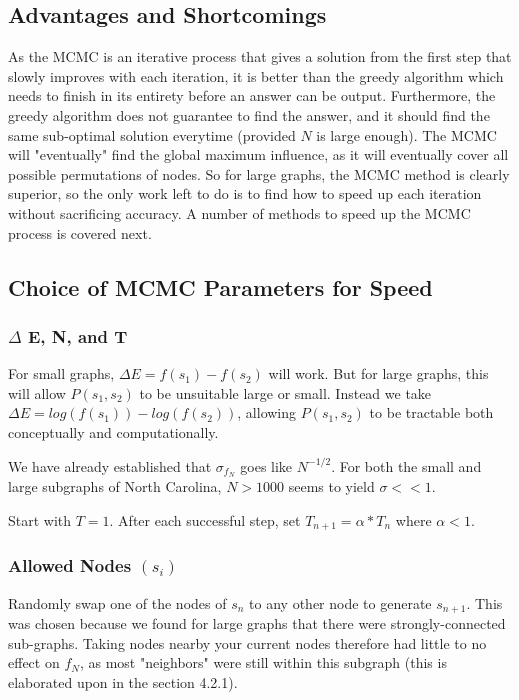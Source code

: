 \documentclass{article}
\begin{document}
	\subsection{Advantages and Shortcomings}
	
	As the MCMC is an iterative process that gives a solution from the first step that slowly improves with each iteration, it is better than the greedy algorithm which needs to finish in its entirety before an answer can be output. Furthermore, the greedy algorithm does not guarantee to find the answer, and it should find the same sub-optimal solution everytime (provided $N$ is large enough). The MCMC will "eventually" find the global maximum influence, as it will eventually cover all possible permutations of nodes. So for large graphs, the MCMC method is clearly superior, so the only work left to do is to find how to speed up each iteration without sacrificing accuracy. A number of methods to speed up the MCMC process is covered next.
	
	\subsection{Choice of MCMC Parameters for Speed}
	
	\subsubsection{$\Delta$ E, N, and T}
	
	For small graphs, $\Delta E = f(s_1) - f(s_2)$ will work. But for large graphs, this will allow $P(s_1,s_2)$ to be unsuitable large or small. Instead we take $\Delta E = log(f(s_1)) - log(f(s_2))$, allowing $P(s_1,s_2)$ to be tractable both conceptually and computationally.
	
	
	
	We have already established that $\sigma_{f_N}$ goes like $N^{-1/2}$. For both the small and large subgraphs of North Carolina, $N > 1000$ seems to yield $\sigma << 1$.
	
	
	
	Start with $T = 1$. After each successful step, set $T_{n+1} = \alpha*T_n$ where $\alpha < 1$.

	\subsubsection{Allowed Nodes $(s_i)$}
	
	Randomly swap one of the nodes of $s_n$ to any other node to generate $s_{n+1}$. This was chosen because we found for large graphs that there were strongly-connected sub-graphs. Taking nodes nearby your current nodes therefore had little to no effect on $f_N$, as most "neighbors" were still within this subgraph (this is elaborated upon in the section 4.2.1).
	
\end{document}
